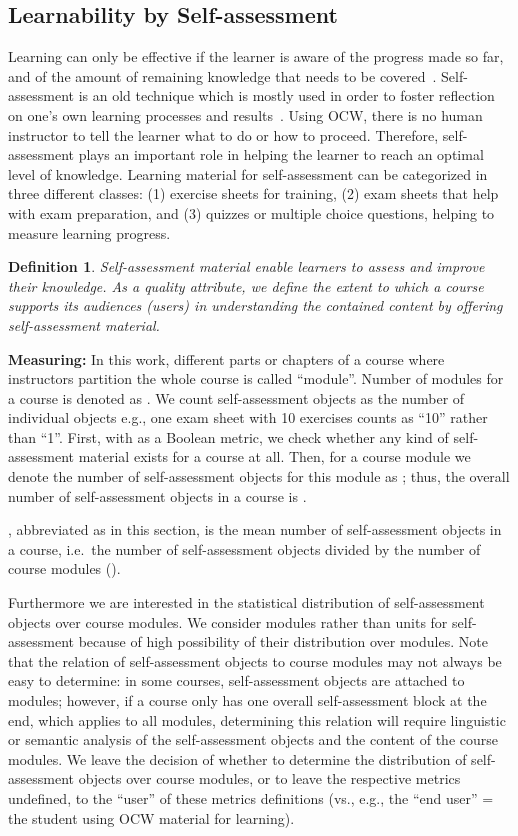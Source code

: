 \documentclass{sig-alternate}
\theoremstyle{definition}
\newtheorem{defn}{Definition}
\begin{document}
\subsection{Learnability by Self-assessment}
\label{sec:SA}
Learning can only be effective if the learner is aware of the progress made so far, and of the amount of remaining knowledge that needs to be covered~\parencite{Boud.1995}.
Self-assessment is an old technique which is mostly used in order to foster reflection on one's own learning processes and results~\parencite{Dunning.2004}.
Using OCW, there is no human instructor to tell the learner what to do or how to proceed.
Therefore, self-assessment plays an important role in helping the learner to reach an optimal level of knowledge.
Learning material for self-assessment can be categorized in three different classes: 
(1) exercise sheets for training, 
(2) exam sheets that help with exam preparation, and 
(3) quizzes or multiple choice questions, helping to measure learning progress.

\begin{defn}
\emph{Self-assessment material enable learners to assess and improve their knowledge.
As a quality attribute, we define the extent to which a course supports its audiences (users) in understanding the contained content by offering self-assessment material.}
\end{defn}

\noindent\textbf{Measuring:}
In this work, different parts or chapters of a course where instructors partition the whole course is called ``module''.
Number of modules for a course is denoted as .
We count self-assessment objects as the number of individual objects e.g., one exam sheet with 10 exercises counts as ``10'' rather than ``1''.
First, with  as a Boolean metric, we check whether any kind of self-assessment material exists for a course at all.
Then, for a course module  we denote the number of self-assessment objects for this module as ; thus, the overall number of self-assessment objects in a course is .

, abbreviated as  in this section, is the mean number of self-assessment objects in a course, i.e.\ the number of self-assessment objects divided by the number of course modules ().

Furthermore we are interested in the statistical distribution of self-assessment objects over course modules.
We consider modules rather than units for self-assessment because of high possibility of their distribution over modules.
Note that the relation of self-assessment objects to course modules may not always be easy to determine: in some courses, self-assessment objects are attached to modules; however, if a course only has one overall self-assessment block at the end, which applies to all modules, determining this relation will require linguistic or semantic analysis of the self-assessment objects and the content of the course modules.
We leave the decision of whether to determine the distribution of self-assessment objects over course modules, or to leave the respective metrics undefined, to the ``user'' of these metrics definitions (vs., e.g., the ``end user'' = the student using OCW material for learning).
\end{document}
